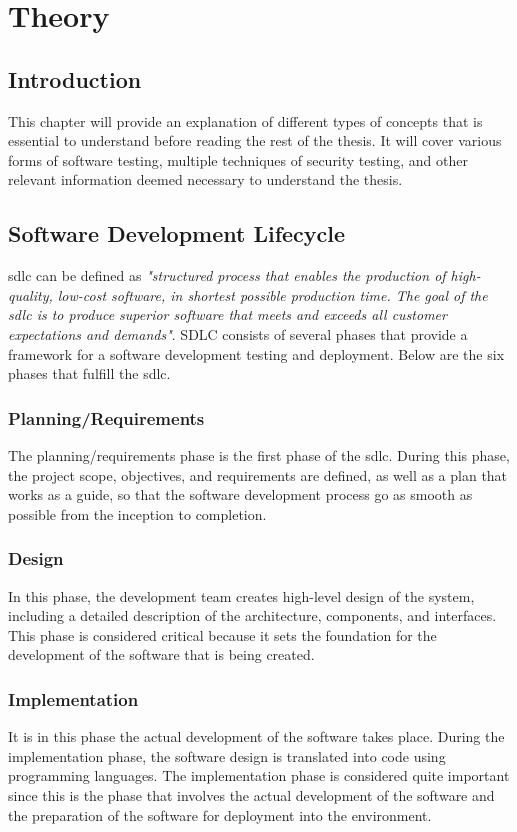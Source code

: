\chapter{Theory}
\label{chap:Theory}

\section{Introduction}
This chapter will provide an explanation of different types of concepts that is essential to understand before reading the rest of the thesis. It will cover various forms of software testing, multiple techniques of security testing, and other relevant information deemed necessary to understand the thesis.


\section{Software Development Lifecycle}
\acrlong{sdlc} can be defined as \textit{"structured process that enables the production of high-quality, low-cost software, in shortest possible production time. The goal of the \acrshort{sdlc} is to produce superior software that meets and exceeds all customer expectations and demands"}\cite{sdlc}.  SDLC consists of several phases that provide a framework for a software development testing and deployment. Below are the six phases that fulfill the \acrshort{sdlc}. 

  \subsection{Planning/Requirements} 
 The planning/requirements phase is the first phase of the \acrshort{sdlc}. During this phase, the project scope, objectives, and requirements are defined, as well as a plan that works as a guide, so that the software development process go as smooth as possible from the inception to completion. \cite{PlanningSDLC}
 
 \subsection{Design}
 In this phase, the development team creates high-level design of the system, including a detailed description of the architecture, components, and interfaces. This phase is considered critical because it sets the foundation for the development of the software that is being created. \cite{DesignSDLC} 
 
 \subsection{Implementation}
 It is in this phase the actual development of the software takes place. During the implementation phase, the software design is translated into code using programming languages. The implementation phase is considered quite important since this is the phase that involves the actual development of the software and the preparation of the software for deployment into the environment. \cite{ImplementationSDLC}
 
